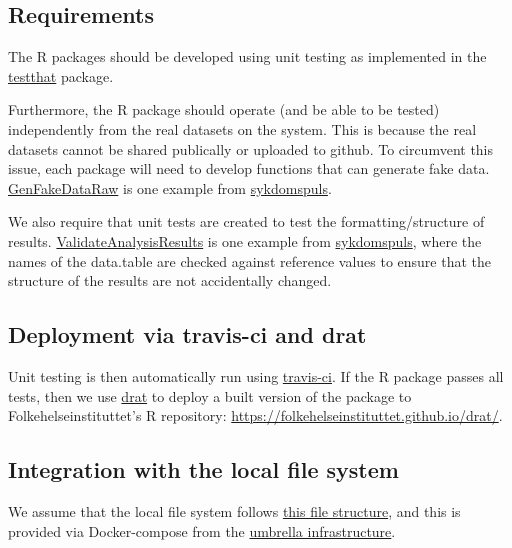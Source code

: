 \documentclass[12pt,]{article}
\begin{document}
\subsection{Requirements}\label{requirements}

The R packages should be developed using unit testing as implemented in
the \href{http://r-pkgs.had.co.nz/tests.html}{testthat} package.

Furthermore, the R package should operate (and be able to be tested)
independently from the real datasets on the system. This is because the
real datasets cannot be shared publically or uploaded to github. To
circumvent this issue, each package will need to develop functions that
can generate fake data.
\href{https://folkehelseinstituttet.github.io/dashboards_sykdomspuls/reference/GenFakeDataRaw.html}{GenFakeDataRaw}
is one example from
\href{https://folkehelseinstituttet.github.io/dashboards_sykdomspuls/}{sykdomspuls}.

We also require that unit tests are created to test the
formatting/structure of results.
\href{https://folkehelseinstituttet.github.io/dashboards_sykdomspuls/reference/ValidateAnalysisResults.html}{ValidateAnalysisResults}
is one example from
\href{https://folkehelseinstituttet.github.io/dashboards_sykdomspuls/}{sykdomspuls},
where the names of the data.table are checked against reference values
to ensure that the structure of the results are not accidentally
changed.

\subsection{Deployment via travis-ci and
drat}\label{deployment-via-travis-ci-and-drat}

Unit testing is then automatically run using
\href{http://r-pkgs.had.co.nz/check.html\#travis}{travis-ci}. If the R
package passes all tests, then we use
\href{https://github.com/eddelbuettel/drat}{drat} to deploy a built
version of the package to Folkehelseinstituttet's R repository:
\url{https://folkehelseinstituttet.github.io/drat/}.

\subsection{Integration with the local file
system}\label{integration-with-the-local-file-system}

We assume that the local file system follows
\protect\hyperlink{internalfilestructure}{this file structure}, and this
is provided via Docker-compose from the
\protect\hyperlink{umbrella}{umbrella infrastructure}.
\end{document}
